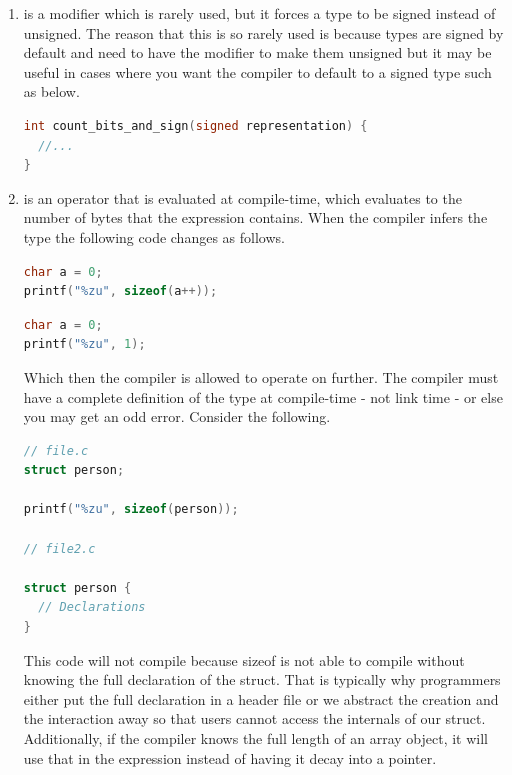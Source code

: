 \begin{enumerate}
	      \begin{lstlisting}[language=C]
int process() {
  if (connect(...)) {
    return -1;
  } else if (bind(...)) {
    return -2;
  }
  return 0;
}
\end{lstlisting}

	    \item {} is a modifier which is rarely used, but it forces a type to be signed instead of unsigned.
        The reason that this is so rarely used is because types are signed by default and need to have the  modifier to make them unsigned but it may be useful in cases where you want the compiler to default to a signed type such as below.

	      \begin{lstlisting}[language=C]
int count_bits_and_sign(signed representation) {
  //...
}
\end{lstlisting}
	    \item {} is an operator that is evaluated at compile-time, which evaluates to the number of bytes that the expression contains.
        When the compiler infers the type the following code changes as follows.
	      \begin{lstlisting}[language=C]
char a = 0;
printf("%zu", sizeof(a++));
\end{lstlisting}

	      \begin{lstlisting}[language=C]
char a = 0;
printf("%zu", 1);
\end{lstlisting}

	      Which then the compiler is allowed to operate on further.
        The compiler must have a complete definition of the type at compile-time - not link time - or else you may get an odd error.
        Consider the following.

	      \begin{lstlisting}[language=C]
// file.c
struct person;

printf("%zu", sizeof(person));

// file2.c

struct person {
  // Declarations
}
\end{lstlisting}

	      This code will not compile because sizeof is not able to compile  without knowing the full declaration of the  struct.
        That is typically why programmers either put the full declaration in a header file or we abstract the creation and the interaction away so that users cannot access the internals of our struct.
        Additionally, if the compiler knows the full length of an array object, it will use that in the expression instead of having it decay into a pointer.


\end{enumerate}
